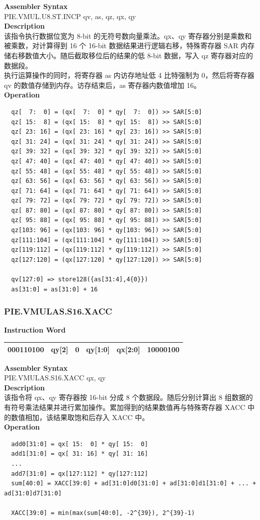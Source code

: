 \textbf{Assembler Syntax} \\
PIE.VMUL.U8.ST.INCP qv, as, qz, qx, qy \\
\textbf{Description} \\
该指令执行数据位宽为 8-bit 的无符号数向量乘法。qx、qy 寄存器分别是乘数和被乘数，对计算得到 16 个 16-bit 数据结果进行逻辑右移，特殊寄存器 SAR 内存储右移数值大小。随后截取移位后的结果的低 8-bit 数据，写入 qz 寄存器对应的数据段。\\ 执行运算操作的同时，将寄存器 as 内访存地址低 4 比特强制为 0，然后将寄存器 qv 的数值存储到内存。访存结束后，as 寄存器内数值增加 16。\\
\textbf{Operation}
\begin{lstlisting}
  qz[  7:  0] = (qx[  7:  0] * qy[  7:  0]) >> SAR[5:0]
  qz[ 15:  8] = (qx[ 15:  8] * qy[ 15:  8]) >> SAR[5:0]
  qz[ 23: 16] = (qx[ 23: 16] * qy[ 23: 16]) >> SAR[5:0]
  qz[ 31: 24] = (qx[ 31: 24] * qy[ 31: 24]) >> SAR[5:0]
  qz[ 39: 32] = (qx[ 39: 32] * qy[ 39: 32]) >> SAR[5:0]
  qz[ 47: 40] = (qx[ 47: 40] * qy[ 47: 40]) >> SAR[5:0]
  qz[ 55: 48] = (qx[ 55: 48] * qy[ 55: 48]) >> SAR[5:0]
  qz[ 63: 56] = (qx[ 63: 56] * qy[ 63: 56]) >> SAR[5:0]
  qz[ 71: 64] = (qx[ 71: 64] * qy[ 71: 64]) >> SAR[5:0]
  qz[ 79: 72] = (qx[ 79: 72] * qy[ 79: 72]) >> SAR[5:0]
  qz[ 87: 80] = (qx[ 87: 80] * qy[ 87: 80]) >> SAR[5:0]
  qz[ 95: 88] = (qx[ 95: 88] * qy[ 95: 88]) >> SAR[5:0]
  qz[103: 96] = (qx[103: 96] * qy[103: 96]) >> SAR[5:0]
  qz[111:104] = (qx[111:104] * qy[111:104]) >> SAR[5:0]
  qz[119:112] = (qx[119:112] * qy[119:112]) >> SAR[5:0]
  qz[127:120] = (qx[127:120] * qy[127:120]) >> SAR[5:0]

  qv[127:0] => store128({as[31:4],4{0}})
  as[31:0] = as[31:0] + 16
\end{lstlisting}

\newpage
\subsubsection{PIE.VMULAS.S16.XACC}\label{instruction:PIEVMULASS16XACC}
\setlength\tabcolsep{6pt}
\textbf{Instruction Word} \\
\begin{tabular}{|c|c|c|c|c|c|}
	\hline
	000110100 & qy[2] & 0 & qy[1:0] & qx[2:0] & 10000100 \\
	\hline
\end{tabular}

\textbf{Assembler Syntax} \\
PIE.VMULAS.S16.XACC qx, qy \\
\textbf{Description} \\
该指令将 qx、qy 寄存器按 16-bit 分成 8 个数据段。随后分别计算出 8 组数据的有符号乘法结果并进行累加操作。累加得到的结果数值再与特殊寄存器 XACC 中的数值相加，该结果取饱和后存入 XACC 中。\\
\textbf{Operation}
\begin{lstlisting}
  add0[31:0] = qx[ 15:  0] * qy[ 15:  0]
  add1[31:0] = qx[ 31: 16] * qy[ 31: 16]
  ...
  add7[31:0] = qx[127:112] * qy[127:112]
  sum[40:0] = XACC[39:0] + ad[31:0]d0[31:0] + ad[31:0]d1[31:0] + ... + ad[31:0]d7[31:0]

  XACC[39:0] = min(max(sum[40:0], -2^{39}), 2^{39}-1)
\end{lstlisting}

